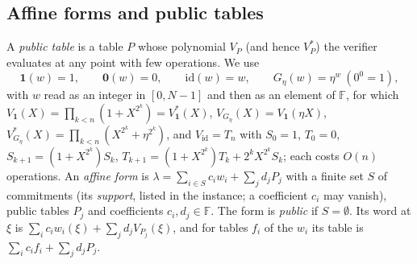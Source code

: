 \documentclass[11pt]{article}
\theoremstyle{definition}
\newcommand{\F}{\mathbb{F}}
\newcommand{\iv}[2]{[#1,#2]}
\begin{document}
\subsection{Affine forms and public tables}

A \emph{public table} is a table $P$ whose polynomial $V_P$ (and hence $V_P^\ast$) the verifier evaluates at any point with few operations. We use
\[
\mathbf 1(w)=1,\qquad \mathbf 0(w)=0,\qquad \mathrm{id}(w)=w,\qquad G_\eta(w)=\eta^{w}\ (0^0=1),
\]
with $w$ read as an integer in $\iv{0}{N-1}$ and then as an element of $\F$, for which $V_{\mathbf 1}(X)=\prod_{k<n}(1+X^{2^k})=V_{\mathbf 1}^\ast(X)$, $V_{G_\eta}(X)=V_{\mathbf 1}(\eta X)$, $V_{G_\eta}^\ast(X)=\prod_{k<n}(X^{2^k}+\eta^{2^k})$, and $V_{\mathrm{id}}=T_n$ with $S_0=1$, $T_0=0$, $S_{k+1}=(1+X^{2^k})S_k$, $T_{k+1}=(1+X^{2^k})T_k+2^kX^{2^k}S_k$; each costs $O(n)$ operations.
An \emph{affine form} is $\lambda=\sum_{i\in S}c_iw_i+\sum_jd_jP_j$ with a finite set $S$ of commitments (its \emph{support}, listed in the instance; a coefficient $c_i$ may vanish), public tables $P_j$ and coefficients $c_i,d_j\in\F$. The form is \emph{public} if $S=\emptyset$. Its word at $\xi$ is $\sum_ic_iw_i(\xi)+\sum_jd_jV_{P_j}(\xi)$, and for tables $f_i$ of the $w_i$ its table is $\sum_ic_if_i+\sum_jd_jP_j$.
\end{document}
